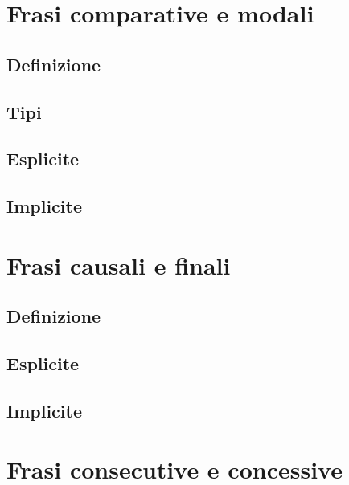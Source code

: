 \documentclass[a4paper,twoside,11pt,chapterprefix=false,bibliography=totocnumbered,listof=flat]{scrbook}
\begin{document}
\hypertarget{frasi-comparative-e-modali}{%
\chapter{Frasi comparative e modali}\label{frasi-comparative-e-modali}}

\hypertarget{definizione-1}{%
\section{Definizione}\label{definizione-1}}

\hypertarget{tipi-2}{%
\section{Tipi}\label{tipi-2}}

\hypertarget{esplicite-3}{%
\section{Esplicite}\label{esplicite-3}}

\hypertarget{implicite-3}{%
\section{Implicite}\label{implicite-3}}

\hypertarget{frasi-causali-e-finali}{%
\chapter{Frasi causali e finali}\label{frasi-causali-e-finali}}

\hypertarget{definizione-2}{%
\section{Definizione}\label{definizione-2}}

\hypertarget{esplicite-4}{%
\section{Esplicite}\label{esplicite-4}}

\hypertarget{implicite-4}{%
\section{Implicite}\label{implicite-4}}

\hypertarget{frasi-consecutive-e-concessive}{%
\chapter{Frasi consecutive e
concessive}\label{frasi-consecutive-e-concessive}}
\end{document}
